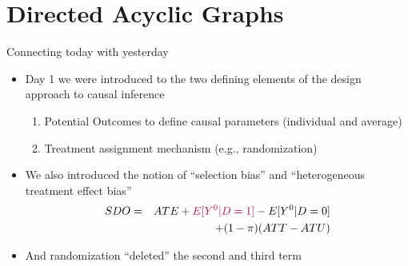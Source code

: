 \documentclass{beamer}
\begin{document}




\section{Directed Acyclic Graphs}

\begin{frame}{Connecting today with yesterday}

\begin{itemize}
\item Day 1 we were introduced to the two defining elements of the design approach to causal inference
	\begin{enumerate}
	\item Potential Outcomes to define causal parameters (individual and average)
	\item Treatment assignment mechanism (e.g., randomization)
	\end{enumerate}
\item We also introduced the notion of ``selection bias'' and ``heterogeneous treatment effect bias''
\begin{eqnarray*}
SDO &=& ATE + \textcolor{purple}{E[Y^0|D=1]} - E[Y^0|D=0] \\
&& + (1-\pi)(ATT-ATU)
\end{eqnarray*}
\item And randomization ``deleted'' the second and third term
\end{itemize}

\end{frame}
\end{document}
